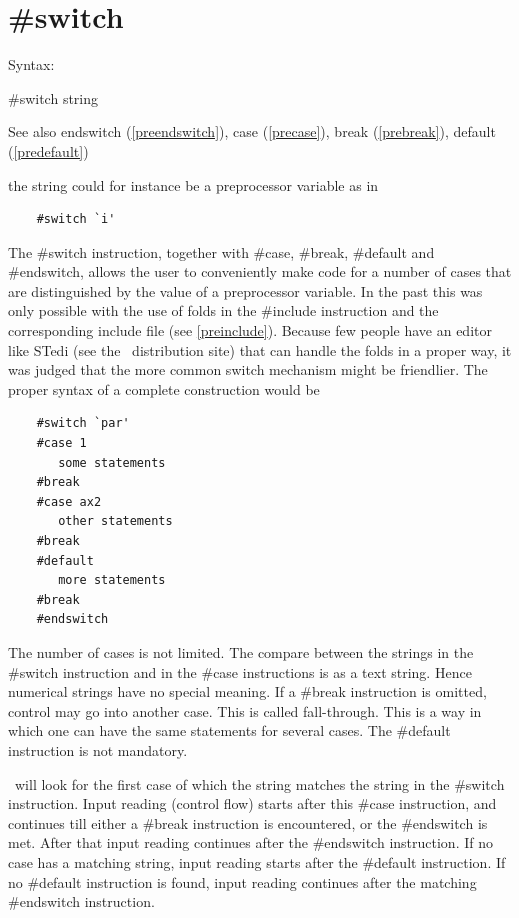 
\section{\#switch}
\label{preswitch}

\noindent Syntax:

\#switch string
 
\noindent See also endswitch (\ref{preendswitch}),
        case (\ref{precase}),
        break (\ref{prebreak}),
        default (\ref{predefault})

\noindent the string could for instance be a preprocessor 
variable as in
\begin{verbatim}
    #switch `i'
\end{verbatim}
The \#switch instruction, together with 
\#case, \#break, \#default 
and \#endswitch, allows the user to conveniently make 
code for a number of cases that are distinguished by the value of a 
preprocessor variable. In the past this was only possible with the use of 
folds in the \#include instruction and the 
corresponding include file (see \ref{preinclude}). 
Because few people have an editor like STedi (see the \FORM\ distribution 
site) that can handle the folds in a proper way, it was judged that the 
more common switch mechanism might be friendlier. The proper syntax of a 
complete construction would be
\begin{verbatim}
    #switch `par'
    #case 1
       some statements
    #break
    #case ax2
       other statements
    #break
    #default
       more statements
    #break
    #endswitch
\end{verbatim}
The number of cases is not limited. The compare between the strings in the 
\#switch instruction and in the \#case instructions is as a text string. 
Hence numerical strings have no special meaning. If a \#break instruction 
is omitted, control may go into another case. This is called 
fall-through. 
This is a way in which one can have the same statements for several cases. 
The \#default instruction is not mandatory.

\FORM\ will look for the first case of which the string matches the string 
in the \#switch instruction. Input reading (control flow) starts after this 
\#case instruction, and continues till either a \#break instruction is 
encountered, or the \#endswitch is met. After that input reading continues 
after the \#endswitch instruction. If no case has a matching string, input 
reading starts after the \#default instruction. If no \#default instruction 
is found, input reading continues after the matching \#endswitch 
instruction.

